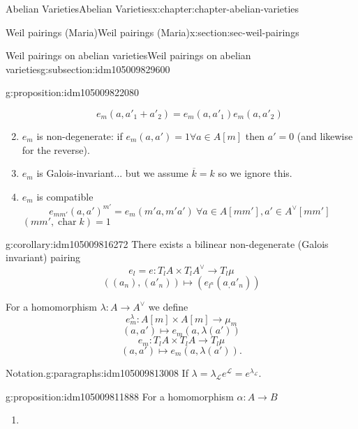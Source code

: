\documentclass[oneside,10pt,]{book}
\numberwithin{equation}{section}
\newcommand{\sheaf}[1]{\operatorname{\mathcal{#1}}}
\newcommand{\lb}{[}
\newcommand{\rb}{]}
\DeclareMathOperator{\characteristic}{char}
\begin{document}
\begin{chapterptx}{Abelian Varieties}{}{Abelian Varieties}{}{}{x:chapter:chapter-abelian-varieties}
\begin{sectionptx}{Weil pairings (Maria)}{}{Weil pairings (Maria)}{}{}{x:section:sec-weil-pairings}
\begin{subsectionptx}{Weil pairings on abelian varieties}{}{Weil pairings on abelian varieties}{}{}{g:subsection:idm105009829600}
\begin{proposition}{}{}{g:proposition:idm105009822080}
\begin{enumerate}
%
\begin{equation*}
e_m(a,a'_1+a'_2) = e_m(a,a'_1)e_m(a,a'_2)
\end{equation*}
%
\item{}\(e_m\) is non-degenerate: if \(e_m(a,a') = 1 \forall a\in A\lb m\rb\) then \(a' = 0\) (and likewise for the reverse).%
\item{}\(e_m\) is Galois-invariant... but we assume \(\overline k =k\) so we ignore this.%
\item{}\(e_m\) is compatible%
\begin{equation*}
e_{mm'} (a,a')^{m'} = e_m(m'a, m'a') \ \forall a \in A[mm'], a'\in A^\vee [mm']
\end{equation*}
\((mm',\characteristic k) = 1\)%
\end{enumerate}
%
\end{proposition}
\begin{corollary}{}{}{g:corollary:idm105009816272}%
There exists a bilinear non-degenerate (Galois invariant) pairing%
\begin{equation*}
e_l = e \colon T_lA \times T_lA^\vee \to T_l\mu
\end{equation*}
%
\begin{equation*}
((a_n), (a'_n)) \mapsto (e_{l^n}(a_,a'_n))
\end{equation*}
%
\end{corollary}
For a homomorphism \(\lambda \colon A \to A^\vee\) we define%
\begin{equation*}
e_m^\lambda \colon A[m]\times A [m] \to \mu_m
\end{equation*}
%
\begin{equation*}
(a,a') \mapsto e_m(a, \lambda(a'))
\end{equation*}
%
\begin{equation*}
e_m \colon T_lA\times T_l A \to T_l \mu
\end{equation*}
%
\begin{equation*}
(a,a') \mapsto e_m(a, \lambda(a'))\text{.}
\end{equation*}
%
\begin{paragraphs}{Notation.}{g:paragraphs:idm105009813008}%
If \(\lambda = \lambda_{\sheaf L} e^{\sheaf L} = e^{\lambda_{\sheaf L}}\).%
\end{paragraphs}%
\begin{proposition}{}{}{g:proposition:idm105009811888}%
For a homomorphism \(\alpha \colon A \to B\)%
\begin{enumerate}
\item{}%
\begin{equation*}

\end{equation*}
\end{enumerate}
\end{proposition}
\end{subsectionptx}
\end{sectionptx}
\end{chapterptx}
\end{document}
